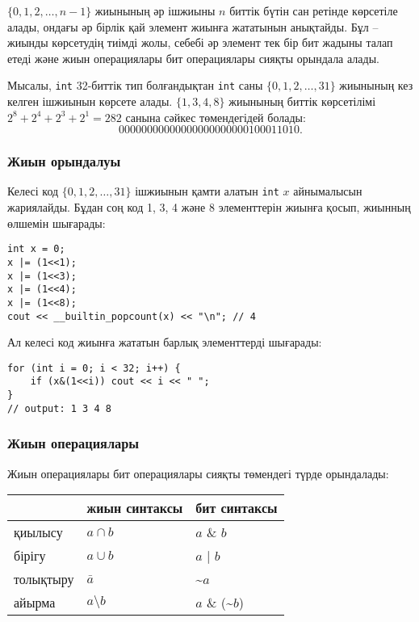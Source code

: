 $\{0,1,2,\ldots,n-1\}$ жиынының әр ішжиыны 
$n$ биттік бүтін сан ретінде көрсетіле алады,
ондағы әр бірлік қай элемент жиынға жататынын 
анықтайды. Бұл -- жиынды көрсетудің тиімді жолы,
себебі әр элемент тек бір бит жадыны талап етеді
және жиын операциялары бит операциялары сияқты
орындала алады.

Мысалы, \texttt{int} 32-биттік тип болғандықтан 
\texttt{int} саны $\{0,1,2,\ldots,31\}$ жиынының кез келген 
ішжиынын көрсете алады. $\{1,3,4,8\}$ жиынының биттік көрсетілімі 
$2^8+2^4+2^3+2^1=282$ санына сәйкес төмендегідей болады: 
\[00000000000000000000000100011010.\]

\subsubsection{Жиын орындалуы}

Келесі код $\{0,1,2,\ldots,31\}$ ішжиынын қамти алатын
\texttt{int} $x$ айнымалысын жариялайды.
Бұдан соң код 1, 3, 4 және 8 элементтерін
жиынға қосып, жиынның өлшемін шығарады:
\begin{lstlisting}
int x = 0;
x |= (1<<1);
x |= (1<<3);
x |= (1<<4);
x |= (1<<8);
cout << __builtin_popcount(x) << "\n"; // 4
\end{lstlisting}
Ал келесі код жиынға жататын барлық 
элементтерді шығарады:
\begin{lstlisting}
for (int i = 0; i < 32; i++) {
    if (x&(1<<i)) cout << i << " ";
}
// output: 1 3 4 8 
\end{lstlisting}

\subsubsection{Жиын операциялары}

Жиын операциялары бит операциялары сияқты төмендегі түрде орындалады:

\begin{center}
\begin{tabular}{lll}
& жиын синтаксы & бит синтаксы \\
\hline
қиылысу & $a \cap b$ & $a$ \& $b$ \\
бірігу & $a \cup b$ & $a$ | $b$ \\
толықтыру & $\bar a$ & \textasciitilde$a$ \\
айырма & $a \setminus b$ & $a$ \& (\textasciitilde$b$) \\
\end{tabular}
\end{center}

